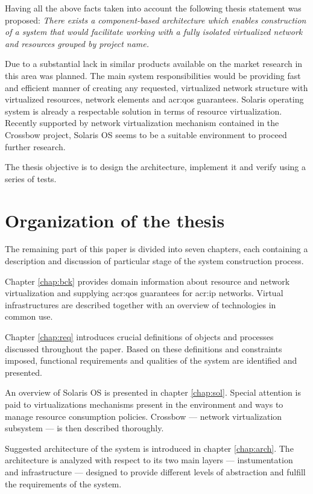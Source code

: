 \documentclass[11pt,openany]{book}
\begin{document}
      Having all the above facts taken into account the following thesis statement was proposed: \textit{There exists a
      component-based architecture which enables construction of a system that would facilitate working with a fully
      isolated virtualized network and resources grouped by project name.}

      Due to a substantial lack in similar products available on the market research in this area was planned. The main system
      responsibilities would be providing fast and efficient manner of creating any requested, virtualized network
      structure with virtualized resources, network elements and \gls{acr:qos} guarantees.  Solaris operating system is
      already a respectable solution in terms of resource virtualization. Recently supported by network virtualization
      mechanism contained in the Crossbow project, Solaris OS seems to be a suitable environment to proceed further
      research.

      The thesis objective is to design the architecture, implement it and verify using a series of tests.


    \section{Organization of the thesis}

      The remaining part of this paper is divided into seven chapters, each containing a description and discussion of
      particular stage of the system construction process.

      Chapter \ref{chap:bck} provides domain information about resource and network virtualization and supplying
      \gls{acr:qos} guarantees for \gls{acr:ip} networks. Virtual infrastructures are described
      together with an overview of technologies in common use.

      Chapter \ref{chap:req} introduces crucial definitions of objects and processes discussed throughout the paper.
      Based on these definitions and constraints imposed, functional requirements and qualities of the system are
      identified and presented.

      An overview of Solaris OS is presented in chapter \ref{chap:sol}. Special attention is paid to virtualizations
      mechanisms present in the environment and ways to manage resource consumption policies. Crossbow --- network
      virtualization subsystem --- is then described thoroughly.

      Suggested architecture of the system is introduced in chapter \ref{chap:arch}. The architecture is analyzed with
      respect to its two main layers --- instumentation and infrastructure --- designed to provide different levels of
      abstraction and fulfill the requirements of the system.
\end{document}
